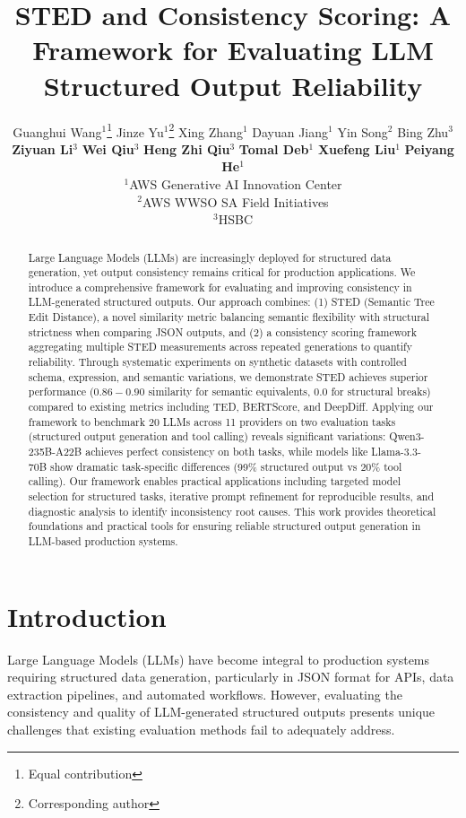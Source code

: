 \documentclass{article}
\title{STED and Consistency Scoring: A Framework for Evaluating LLM Structured Output Reliability}
\author{
Guanghui Wang$^{1}$\thanks{Equal contribution} \quad 
Jinze Yu$^{1}$\footnotemark[1]\thanks{Corresponding author} \quad
Xing Zhang$^{1}$ \quad
Dayuan Jiang$^{1}$ \quad
Yin Song$^{2}$ \quad
Bing Zhu$^{3}$  \\
\textbf{Ziyuan Li}$^{3}$ \quad
\textbf{Wei Qiu}$^{3}$ \quad
\textbf{Heng Zhi Qiu}$^{3}$ \quad
\textbf{Tomal Deb}$^{1}$ \quad
\textbf{Xuefeng Liu}$^{1}$ \quad 
\textbf{Peiyang He}$^{1}$\\
$^{1}$AWS Generative AI Innovation Center\\
$^{2}$AWS WWSO SA Field Initiatives\\
$^{3}$HSBC\\
}
\begin{document}
\maketitle


\begin{abstract}
Large Language Models (LLMs) are increasingly deployed for structured data generation, yet output consistency remains critical for production applications. We introduce a comprehensive framework for evaluating and improving consistency in LLM-generated structured outputs. Our approach combines: (1) STED (Semantic Tree Edit Distance), a novel similarity metric balancing semantic flexibility with structural strictness when comparing JSON outputs, and (2) a consistency scoring framework aggregating multiple STED measurements across repeated generations to quantify reliability. Through systematic experiments on synthetic datasets with controlled schema, expression, and semantic variations, we demonstrate STED achieves superior performance ($0.86-0.90$ similarity for semantic equivalents, $0.0$ for structural breaks) compared to existing metrics including TED, BERTScore, and DeepDiff. Applying our framework to benchmark 20 LLMs across 11 providers on two evaluation tasks (structured output generation and tool calling) reveals significant variations: Qwen3-235B-A22B achieves perfect consistency on both tasks, while models like Llama-3.3-70B show dramatic task-specific differences (99\% structured output vs 20\% tool calling). Our framework enables practical applications including targeted model selection for structured tasks, iterative prompt refinement for reproducible results, and diagnostic analysis to identify inconsistency root causes. This work provides theoretical foundations and practical tools for ensuring reliable structured output generation in LLM-based production systems.
\end{abstract}


\section{Introduction}

Large Language Models (LLMs) have become integral to production systems requiring structured data generation, particularly in JSON format for APIs, data extraction pipelines, and automated workflows. However, evaluating the consistency and quality of LLM-generated structured outputs presents unique challenges that existing evaluation methods fail to adequately address.
\end{document}
